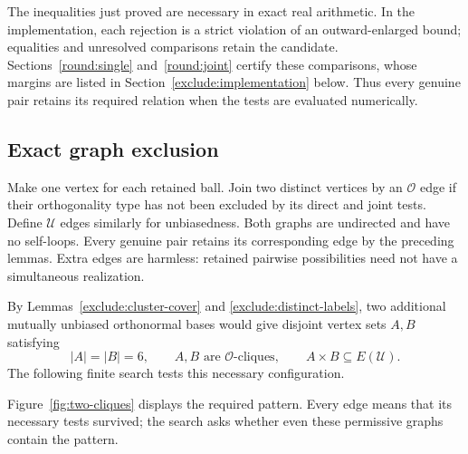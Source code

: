 The inequalities just proved are necessary in exact real arithmetic.
In the implementation, each rejection is a strict violation of an
outward-enlarged bound; equalities and unresolved comparisons retain the
candidate. Sections~\ref{round:single} and~\ref{round:joint} certify these
comparisons, whose margins are listed in
Section~\ref{exclude:implementation} below. Thus every genuine pair
retains its required relation when the tests are evaluated numerically.

\subsection{Exact graph exclusion}

Make one vertex for each retained ball.  Join two distinct vertices by
an $\mathcal O$ edge if their orthogonality type has not been excluded
by its direct and joint tests.  Define $\mathcal U$ edges similarly
for unbiasedness.  Both graphs are undirected and have no self-loops.
Every genuine pair retains its corresponding edge by the preceding
lemmas.  Extra edges are harmless: retained pairwise possibilities
need not have a simultaneous realization.

By Lemmas~\ref{exclude:cluster-cover} and
\ref{exclude:distinct-labels}, two additional mutually unbiased
orthonormal bases would give disjoint vertex sets $A,B$ satisfying
\begin{equation}
 |A|=|B|=6,\qquad A,B\text{ are $\mathcal O$-cliques},\qquad
 A\times B\subseteq E(\mathcal U).
 \label{exclude:graph-configuration}
\end{equation}
The following finite search tests this necessary configuration.

Figure~\ref{fig:two-cliques} displays the required pattern. Every edge
means that its necessary tests survived; the search asks whether even
these permissive graphs contain the pattern.



